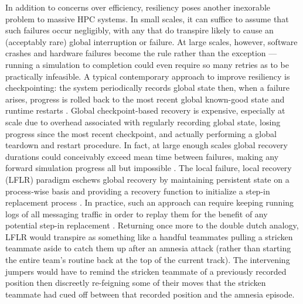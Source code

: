 In addition to concerns over efficiency, resiliency poses another inexorable problem to massive HPC systems.
In small scales, it can suffice to assume that such failures occur negligibly, with any that do transpire likely to cause an (acceptably rare) global interruption or failure.
At large scales, however, software crashes and hardware failures become the rule rather than the exception \citep{dongarra2014applied} --- running a simulation to completion could even require so many retries as to be practically infeasible.
A typical contemporary approach to improve resiliency is checkpointing: the system periodically records global state then, when a failure arises, progress is rolled back to the most recent global known-good state and runtime restarts \citep{hursey2007design}.
Global checkpoint-based recovery is expensive, especially at scale due to overhead associated with regularly recording global state, losing progress since the most recent checkpoint, and actually performing a global teardown and restart procedure.
In fact, at large enough scales global recovery durations could conceivably exceed mean time between failures, making any forward simulation progress all but impossible \citep{dongarra2014applied}.
The local failure, local recovery (LFLR) paradigm eschews global recovery by maintaining persistent state on a process-wise basis and providing a recovery function to initialize a step-in replacement process \citep{heroux2014toward,teranishi2014toward}.
In practice, such an approach can require keeping running logs of all messaging traffic in order to replay them for the benefit of any potential step-in replacement \citep{chakravorty2004fault}.
Returning once more to the double dutch analogy, LFLR would transpire as something like a handful teammates pulling a stricken teammate aside to catch them up after an amnesia attack (rather than starting the entire team's routine back at the top of the current track).
The intervening jumpers would have to remind the stricken teammate of a previously recorded position then discreetly re-feigning some of their moves that the stricken teammate had cued off between that recorded position and the amnesia episode.

